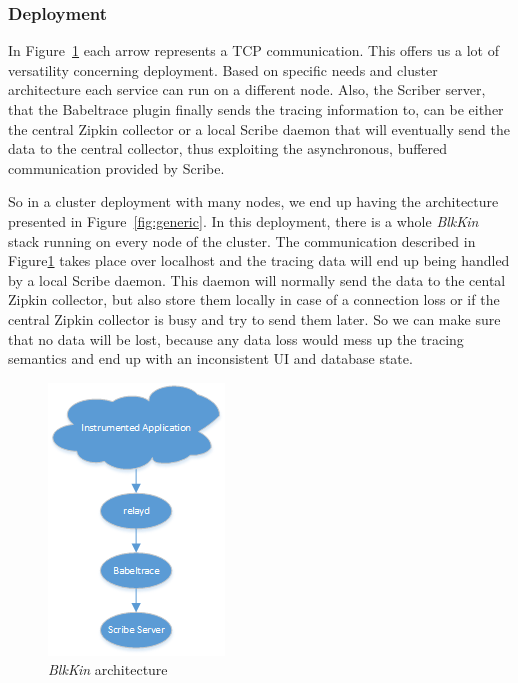 \documentclass[a4paper,10pt,twocolumn]{article}
\begin{document}
\subsubsection{Deployment} In Figure~\ref{fig:specific} each arrow represents a
TCP communication. This offers us a lot of versatility concerning deployment.
Based on specific needs and cluster architecture each service can run on a
different node. Also, the Scriber server, that the Babeltrace plugin finally
sends the tracing information to, can be either the central Zipkin collector or
a local Scribe daemon that will eventually send the data to the central
collector, thus exploiting the asynchronous, buffered communication provided by
Scribe.

So in a cluster deployment with many nodes, we end up having the architecture
presented in Figure~\ref{fig:generic}. In this deployment, there is a whole
\emph{BlkKin} stack running on every node of the cluster. The communication
described in Figure\ref{fig:specific} takes place over localhost and the tracing
data will end up being handled by a local Scribe daemon. This daemon will
normally send the data to the cental Zipkin collector, but also store them
locally in case of a connection loss or if the central Zipkin collector is busy
and try to send them later.  So we can make sure that no data will be lost,
because any data loss would mess up the tracing semantics and end up with an
inconsistent UI and database state.

\begin{figure}[h!]
  \centering
  \includegraphics[scale=0.75]{images/specific.png}
  \caption{\emph{BlkKin} architecture}
  \label{fig:specific}
\end{figure}
\end{document}
